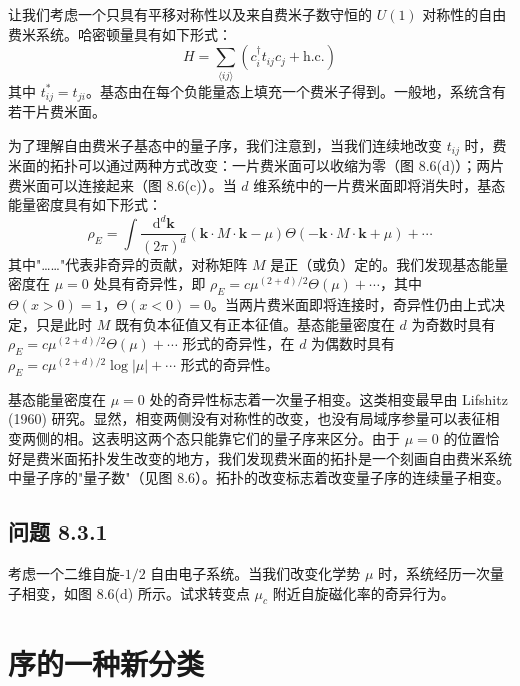 让我们考虑一个只具有平移对称性以及来自费米子数守恒的 $U(1)$ 对称性的自由费米系统。哈密顿量具有如下形式：
\begin{equation*}
H=\sum_{\langle ij\rangle}\left(c_{i}^{\dagger}t_{ij}c_{j}+\text{h.c.}\right)
\end{equation*}
其中 $t_{ij}^{*}=t_{ji}$。基态由在每个负能量态上填充一个费米子得到。一般地，系统含有若干片费米面。

为了理解自由费米子基态中的量子序，我们注意到，当我们连续地改变 $t_{ij}$ 时，费米面的拓扑可以通过两种方式改变：一片费米面可以收缩为零（图 8.6(d)）；两片费米面可以连接起来（图 8.6(c)）。当 $d$ 维系统中的一片费米面即将消失时，基态能量密度具有如下形式：
\begin{equation*}
\rho_{E}=\int\frac{\mathrm{d}^{d}\pmb{k}}{(2\pi)^{d}}\left(\pmb{k}\cdot M\cdot\pmb{k}-\mu\right)\Theta\left(-\pmb{k}\cdot M\cdot\pmb{k}+\mu\right)+\cdots
\end{equation*}
其中"……"代表非奇异的贡献，对称矩阵 $M$ 是正（或负）定的。我们发现基态能量密度在 $\mu=0$ 处具有奇异性，即 $\rho_{E}=c\mu^{(2+d)/2}\Theta(\mu)+\cdots$，其中 $\Theta(x>0)=1$，$\Theta(x<0)=0$。当两片费米面即将连接时，奇异性仍由上式决定，只是此时 $M$ 既有负本征值又有正本征值。基态能量密度在 $d$ 为奇数时具有 $\rho_{E}=c\mu^{(2+d)/2}\Theta(\mu)+\cdots$ 形式的奇异性，在 $d$ 为偶数时具有 $\rho_{E}=c\mu^{(2+d)/2}\log|\mu|+\cdots$ 形式的奇异性。


基态能量密度在 $\mu=0$ 处的奇异性标志着一次量子相变。这类相变最早由 Lifshitz (1960) 研究。显然，相变两侧没有对称性的改变，也没有局域序参量可以表征相变两侧的相。这表明这两个态只能靠它们的量子序来区分。由于 $\mu=0$ 的位置恰好是费米面拓扑发生改变的地方，我们发现费米面的拓扑是一个刻画自由费米系统中量子序的"量子数"（见图 8.6）。拓扑的改变标志着改变量子序的连续量子相变。

\subsection*{问题 8.3.1}

考虑一个二维自旋-$1/2$ 自由电子系统。当我们改变化学势 $\mu$ 时，系统经历一次量子相变，如图 8.6(d) 所示。试求转变点 $\mu_{c}$ 附近自旋磁化率的奇异行为。

\section{序的一种新分类}

